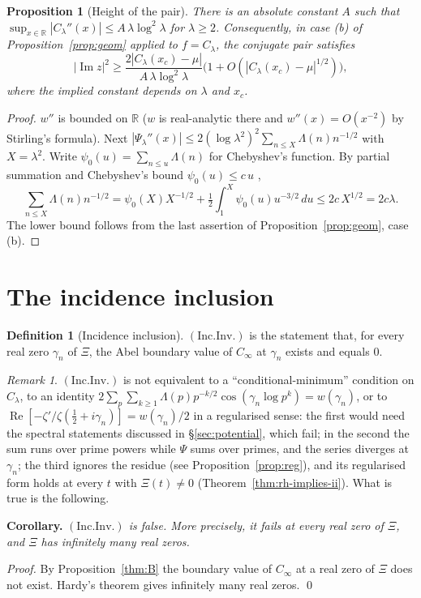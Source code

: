 \documentclass[11pt]{amsart}
\newtheorem{proposition}[theorem]{Proposition}
\theoremstyle{definition}
\newtheorem{definition}[theorem]{Definition}
\theoremstyle{remark}
\newtheorem{remark}[theorem]{Remark}
\renewcommand{\Re}{\operatorname{Re}}
\renewcommand{\Im}{\operatorname{Im}}
\newcommand{\half}{\tfrac12}
\newcommand{\Cinf}{C_\infty}
\newcommand{\Clam}{C_\lambda}
\newcommand{\Psil}{\Psi_\lambda}
\newcommand{\gamn}{\gamma_n}
\newcommand{\incInv}{(\mathrm{Inc.Inv.})}
\begin{document}
\begin{proposition}[Height of the pair]\label{prop:approach}
There is an absolute constant $A$ such that
$\sup_{x\in\mathbb R}|\Clam''(x)|\le A\,\lambda\log^2\lambda$ for $\lambda\ge2$. Consequently, in case {\rm(b)} of
Proposition~\ref{prop:geom} applied to $f=\Clam$, the conjugate pair satisfies
\[
|\Im z|^2\ge\frac{2|\Clam(x_c)-\mu|}{A\,\lambda\log^2\lambda}\big(1+O(|\Clam(x_c)-\mu|^{1/2})\big),
\]
where the implied constant depends on $\lambda$ and $x_c$.
\end{proposition}
\begin{proof}
$w''$ is bounded on $\mathbb R$ ($w$ is real-analytic there and $w''(x)=O(x^{-2})$ by
Stirling's formula). Next $|\Psil''(x)|\le2(\log\lambda^2)^2\sum_{n\le X}\Lambda(n)n^{-1/2}$ with
$X=\lambda^2$. Write $\psi_0(u)=\sum_{n\le u}\Lambda(n)$ for
Chebyshev's function. By partial summation and Chebyshev's bound $\psi_0(u)\le c\,u$
\cite[Ch.~7]{Davenport},
\[
\sum_{n\le X}\Lambda(n)n^{-1/2}=\psi_0(X)X^{-1/2}+\half\int_1^X\psi_0(u)u^{-3/2}\,du
\le2c\,X^{1/2}=2c\lambda.
\]
The lower bound follows from the last assertion of
Proposition~\ref{prop:geom}, case (b).
\end{proof}

\section{The incidence inclusion}\label{sec:inf}

\begin{definition}[Incidence inclusion]\label{def:ii}
$\incInv$ is the statement that, for every real zero $\gamn$ of $\Xi$, the Abel boundary value
of $\Cinf$ at $\gamn$ exists and equals $0$.
\end{definition}

\begin{remark}\label{prop:three}
$\incInv$ is not equivalent to a ``conditional-minimum'' condition on $\Clam$, to an identity
$2\sum_p\sum_{k\ge1}\Lambda(p)p^{-k/2}\cos(\gamn\log p^k)=w(\gamn)$, or to
$\Re[-\zeta'/\zeta(\half+i\gamn)]=w(\gamn)/2$ in a regularised sense: the first would need the
spectral statements discussed in \S\ref{sec:potential}, which fail; in the second the sum runs
over prime powers while $\Psi$ sums over primes, and the series diverges at $\gamn$; the third
ignores the residue (see Proposition~\ref{prop:reg}), and its regularised form holds at every
$t$ with $\Xi(t)\ne0$ (Theorem~\ref{thm:rh-implies-ii}). What is true is the following.

\smallskip\noindent\textbf{Corollary.} \emph{$\incInv$ is false. More
precisely, it fails at every real zero of $\Xi$, and $\Xi$ has infinitely many real zeros.}

\smallskip\noindent\emph{Proof.} By Proposition~\ref{thm:B} the boundary value of $\Cinf$ at a
real zero of $\Xi$ does not exist. Hardy's theorem \cite[Ch.~10]{Titchmarsh} gives infinitely
many real zeros. \qed
\end{remark}
\end{document}
